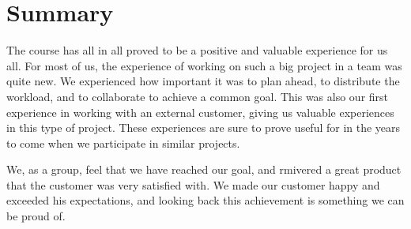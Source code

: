 \section{Summary}
The course has all in all proved to be a positive and valuable experience for us all. For most of us, the experience of working on such a big project in a team was quite new. We experienced how important it was to plan ahead, to distribute the workload, and to collaborate to achieve a common goal. This was also our first experience in working with an external customer, giving us valuable experiences in this type of project. These experiences are sure to prove useful for in the years to come when we participate in similar projects.

We, as a group, feel that we have reached our goal, and rmivered a great product that the customer was very satisfied with. We made our customer happy and exceeded his expectations, and looking back this achievement is something we can be proud of.
